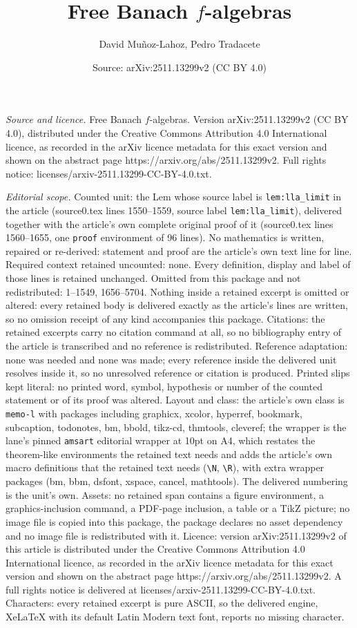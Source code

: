 \documentclass[10pt,a4paper]{amsart}
\title[Free Banach $f$-algebras]{Free Banach $f$-algebras}
\author{David Mu\~noz-Lahoz, Pedro Tradacete}
\date{Source: arXiv:2511.13299v2 (CC BY 4.0)}
\begin{document}
\maketitle

\noindent\emph{Source and licence.} Free Banach $f$-algebras. Version arXiv:2511.13299v2 (CC BY 4.0), distributed under the Creative Commons Attribution 4.0 International licence, as recorded in the arXiv licence metadata for this exact version and shown on the abstract page https://arxiv.org/abs/2511.13299v2. Full rights notice: licenses/arxiv-2511.13299-CC-BY-4.0.txt.\par\smallskip

\noindent\textit{Editorial scope.} Counted unit: the Lem whose source label is \texttt{lem:lla\_limit} in the article (source0.tex lines 1550--1559, source label \texttt{lem:lla\_limit}), delivered together with the article's own complete original proof of it (source0.tex lines 1560--1655, one \texttt{proof} environment of 96 lines). No mathematics is written, repaired or re-derived: statement and proof are the article's own text line for line. Required context retained uncounted: none. Every definition, display and label of those lines is retained unchanged. Omitted from this package and not redistributed: 1--1549, 1656--5704. Nothing inside a retained excerpt is omitted or altered: every retained body is delivered exactly as the article's lines are written, so no omission receipt of any kind accompanies this package. Citations: the retained excerpts carry no citation command at all, so no bibliography entry of the article is transcribed and no reference is redistributed. Reference adaptation: none was needed and none was made; every reference inside the delivered unit resolves inside it, so no unresolved reference or citation is produced. Printed slips kept literal: no printed word, symbol, hypothesis or number of the counted statement or of its proof was altered. Layout and class: the article's own class is \texttt{memo-l} with packages including graphicx, xcolor, hyperref, bookmark, subcaption, todonotes, bm, bbold, tikz-cd, thmtools, cleveref; the wrapper is the lane's pinned \texttt{amsart} editorial wrapper at 10pt on A4, which restates the theorem-like environments the retained text needs and adds the article's own macro definitions that the retained text needs (\texttt{\textbackslash N}, \texttt{\textbackslash R}), with extra wrapper packages (bm, bbm, dsfont, xspace, cancel, mathtools). The delivered numbering is the unit's own. Assets: no retained span contains a figure environment, a graphics-inclusion command, a PDF-page inclusion, a table or a TikZ picture; no image file is copied into this package, the package declares no asset dependency and no image file is redistributed with it. Licence: version arXiv:2511.13299v2 of this article is distributed under the Creative Commons Attribution 4.0 International licence, as recorded in the arXiv licence metadata for this exact version and shown on the abstract page https://arxiv.org/abs/2511.13299v2. A full rights notice is delivered at licenses/arxiv-2511.13299-CC-BY-4.0.txt. Characters: every retained excerpt is pure ASCII, so the delivered engine, XeLaTeX with its default Latin Modern text font, reports no missing character.
\end{document}
